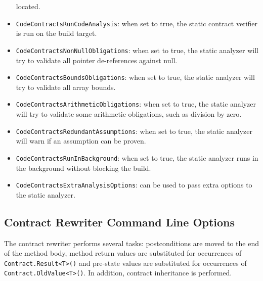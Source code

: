 \documentclass{article}
\newcommand{\code}[1]{\lstinline{#1}}
\begin{document}
\begin{itemize}
  located.
\item \code{CodeContractsRunCodeAnalysis}: when set to true, the
  static contract verifier is run on the build target.
\item \code{CodeContractsNonNullObligations}: when set to true, the
  static analyzer will try to validate all pointer de-references
  against null.
\item \code{CodeContractsBoundsObligations}: when set to true, the
  static analyzer will try to validate all array bounds.
\item \code{CodeContractsArithmeticObligations}: when set to true, the
  static analyzer will try to validate some arithmetic obligations,
  such as division by zero.
\item \code{CodeContractsRedundantAssumptions}: when set to true, the
  static analyzer will warn if an assumption can be proven.
\item \code{CodeContractsRunInBackground}: when set to true, the
  static analyzer runs in the background without blocking the build.
\item \code{CodeContractsExtraAnalysisOptions}: can be used to pass
  extra options to the static analyzer.
\end{itemize}



\subsection{Contract Rewriter Command Line Options}

The contract rewriter performs several tasks: postconditions are moved to
the end of the method body, method return values are substituted for
occurrences of \code{Contract.Result<T>()} and pre-state values are
substituted for occurrences of \code{Contract.OldValue<T>()}. In
addition, contract inheritance is performed.
\end{document}
